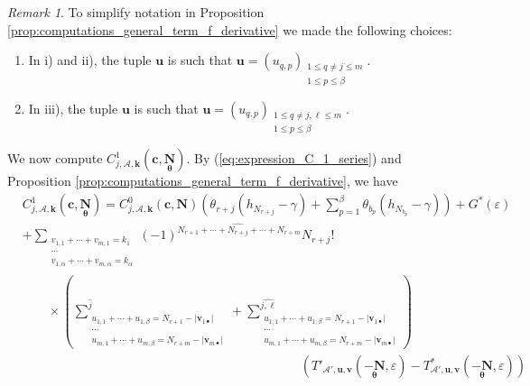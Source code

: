 \documentclass[a4paper]{amsart}
\theoremstyle{remark}
\newtheorem{remark}[theorem]{Remark}
\theoremstyle{definition}
\begin{document}
\begin{remark}
To simplify notation in Proposition \ref{prop:computations_general_term_f_derivative} we made the following choices:
\begin{enumerate}
\item[1)] In i) and ii), the tuple $\mathbf{u}$ is such that $\mathbf{u}=(u_{q,p})_{\substack{1 \leq q \neq j \leq m \\ 1 \leq p \leq \beta}}$.
\item[2)] In iii), the tuple $\mathbf{u}$ is such that $\mathbf{u}=(u_{q,p})_{\substack{1 \leq q \neq j,\ell \leq m \\ 1 \leq p \leq \beta}}$.
\end{enumerate}
\end{remark}

We now compute $C^1_{j,\mathcal{A},\mathbf{k}}(\mathbf{c},\underset{\bm{\theta}}{\mathbf{N}})$. By (\ref{eq:expression_C_1_series}) and Proposition \ref{prop:computations_general_term_f_derivative}, we have
\begin{align}
    &C^1_{j,\mathcal{A},\mathbf{k}}(\mathbf{c},\underset{\bm{\theta}}{\mathbf{N}}) = C^0_{j,\mathcal{A},\mathbf{k}}(\mathbf{c},\mathbf{N})\left( \theta_{r+j} (h_{N_{r+j}}-\gamma) + \sum_{p=1}^{\beta} \theta_{b_{p}}(h_{N_{b_p}}-\gamma)\right)+G^*(\varepsilon) \label{eq:proof_C_1_formula} \\
     & + \sum_{\substack{ v_{1,1}+\cdots+v_{m,1}=k_1 \\ \cdots \\ v_{1,\alpha}+\cdots+v_{m,\alpha}=k_{\alpha}}} (-1)^{N_{r+1}+\cdots+\widehat{N_{r+j}}+\cdots+N_{r+m}} N_{r+j}! \nonumber \\
     & \qquad \times \left( \sum^{\widehat{j}}_{\substack{u_{1,1}+\cdots+u_{1,\beta}=N_{r+1}-|\mathbf{v}_{1 \bullet}| \\ \cdots \\ u_{m,1}+\cdots+u_{m,\beta}=N_{r+m}-|\mathbf{v}_{m \bullet}|}} + \sum^{\widehat{j,\ell}}_{\substack{u_{1,1}+\cdots+u_{1,\beta}=N_{r+1}-|\mathbf{v}_{1 \bullet}| \\ \cdots \\ u_{m,1}+\cdots+u_{m,\beta}=N_{r+m}-|\mathbf{v}_{m \bullet}|}} \right) \nonumber \\
     & \qquad \qquad \qquad \qquad \qquad \qquad \qquad \qquad \qquad \qquad \qquad \left(T'_{\mathcal{A}',\mathbf{u},\mathbf{v}}(\underset{\bm{\theta}}{-\mathbf{N}},\varepsilon)-T^*_{\mathcal{A}',\mathbf{u},\mathbf{v}}(\underset{\bm{\theta}}{-\mathbf{N}},\varepsilon)\right) \nonumber
\end{align}
\end{document}
